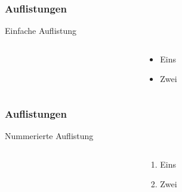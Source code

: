 \begin{frame}
    \frametitle{Auflistungen}
    \begin{block}{Einfache Auflistung}
        \begin{columns}
            \begin{column}{0.4\textwidth}
                
            \end{column}
            \pause
            \begin{column}{0.4\textwidth}
                \begin{itemize}
                    \item Eins
                    \item Zwei
                \end{itemize}
            \end{column}
        \end{columns}
    \end{block}
\end{frame}
\begin{frame}
    \frametitle{Auflistungen}
    \begin{block}{Nummerierte Auflistung}
        \begin{columns}
            \begin{column}{0.4\textwidth}
                
            \end{column}
            \pause
            \begin{column}{0.4\textwidth}
                \begin{enumerate}
                    \item Eins
                    \item Zwei
                \end{enumerate}
            \end{column}
        \end{columns}
    \end{block}
\end{frame}
